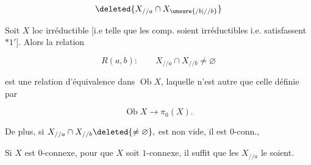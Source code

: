 \[
 \deleted{X_{//a}\cap X_{\unsure{/b|//b}}}
\]

Soit $X$ loc irréductible [i.e telle que les comp.   soient irréductibles i.e. satisfassent  $*1'$]. Alors la relation 

\[
 R(a,b):\qquad X_{//a}\cap X_{//b}\ne\varnothing
\]

est une relation d'équivalence dans $\operatorname{Ob}X$, laquelle n'est autre que celle  définie par

\[
 \operatorname{Ob}X\longrightarrow\pi_0(X).
\]

De plus, si $X_{//a}\cap X_{//b}\deleted{\ne\varnothing},$ est non vide, il est $0$-conn.,  

Si $X$ est $0$-connexe,  pour que $X$ soit $1$-connexe, il suffit que les $X_{//a}$ le soient.
